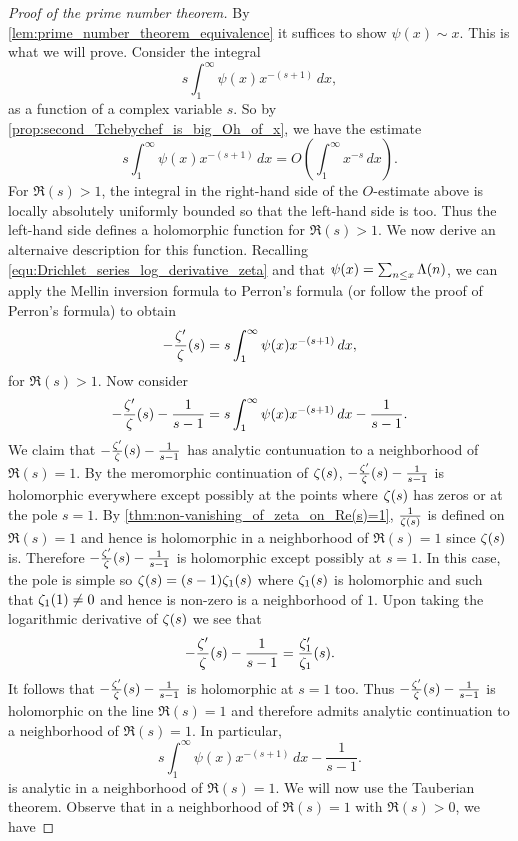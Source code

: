       \begin{proof}[Proof of the prime number theorem]
        By \cref{lem:prime_number_theorem_equivalence} it suffices to show $\psi(x) \sim x$. This is what we will prove. Consider the integral
        \[
          s\int_{1}^{\infty}\psi(x)x^{-(s+1)}\,dx,
        \]
        as a function of a complex variable $s$. So by \cref{prop:second_Tchebychef_is_big_Oh_of_x}, we have the estimate
        \[
          s\int_{1}^{\infty}\psi(x)x^{-(s+1)}\,dx = O\left(\int_{1}^{\infty}x^{-s}\,dx\right).
        \]
        For $\Re(s) > 1$, the integral in the right-hand side of the $O$-estimate above is locally absolutely uniformly bounded so that the left-hand side is too. Thus the left-hand side defines a holomorphic function for $\Re(s) > 1$. We now derive an alternaive description for this function. Recalling \cref{equ:Drichlet_series_log_derivative_zeta} and that $\psi(x) = \sum_{n \le x}\Lambda(n)$, we can apply the Mellin inversion formula to Perron's formula (or follow the proof of Perron's formula) to obtain
        \[
          -\frac{\zeta'}{\zeta}(s) = s\int_{1}^{\infty}\psi(x)x^{-(s+1)}\,dx,
        \]
        for $\Re(s) > 1$. Now consider
        \[
          -\frac{\zeta'}{\zeta}(s)-\frac{1}{s-1} = s\int_{1}^{\infty}\psi(x)x^{-(s+1)}\,dx-\frac{1}{s-1}.
        \]
        We claim that $-\frac{\zeta'}{\zeta}(s)-\frac{1}{s-1}$ has analytic contunuation to a neighborhood of $\Re(s) = 1$. By the meromorphic continuation of $\zeta(s)$, $-\frac{\zeta'}{\zeta}(s)-\frac{1}{s-1}$ is holomorphic everywhere except possibly at the points where $\zeta(s)$ has zeros or at the pole $s = 1$. By \cref{thm:non-vanishing_of_zeta_on_Re(s)=1}, $\frac{1}{\zeta(s)}$ is defined on $\Re(s) = 1$ and hence is holomorphic in a neighborhood of $\Re(s) = 1$ since $\zeta(s)$ is. Therefore $-\frac{\zeta'}{\zeta}(s)-\frac{1}{s-1}$ is holomorphic except possibly at $s = 1$. In this case, the pole is simple so $\zeta(s) = (s-1)\zeta_{1}(s)$ where $\zeta_{1}(s)$ is holomorphic and such that $\zeta_{1}(1) \neq 0$ and hence is non-zero is a neighborhood of $1$. Upon taking the logarithmic derivative of $\zeta(s)$ we see that
        \[
          -\frac{\zeta'}{\zeta}(s)-\frac{1}{s-1} = \frac{\zeta_{1}'}{\zeta_{1}}(s).
        \]
        It follows that $-\frac{\zeta'}{\zeta}(s)-\frac{1}{s-1}$ is holomorphic at $s = 1$ too. Thus $-\frac{\zeta'}{\zeta}(s)-\frac{1}{s-1}$ is holomorphic on the line $\Re(s) = 1$ and therefore admits analytic continuation to a neighborhood of $\Re(s) = 1$. In particular,
        \[
          s\int_{1}^{\infty}\psi(x)x^{-(s+1)}\,dx-\frac{1}{s-1}.
        \]
        is analytic in a neighborhood of $\Re(s) = 1$. We will now use the Tauberian theorem. Observe that in a neighborhood of $\Re(s) = 1$ with $\Re(s) > 0$, we have

\end{proof}
